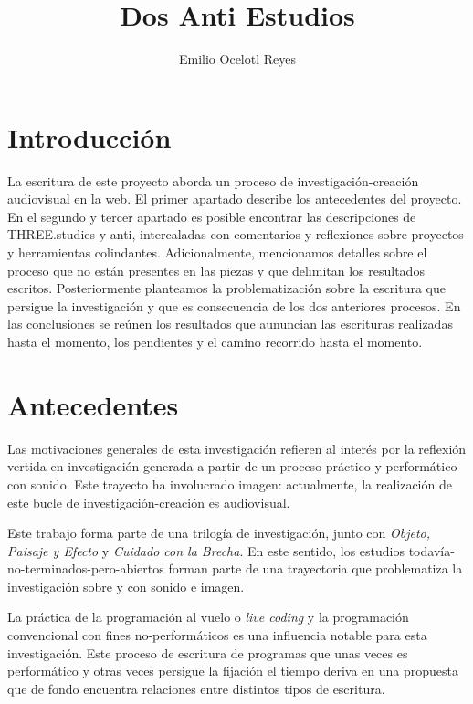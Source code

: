 \documentclass[11pt,letterpaper, twocolumn, twoside, openright,
headinclude,footinclude,BCOR5mm,
numbers=noenddot,cleardoublepage=empty,
tablecaptionabove]{article}
\author{Emilio Ocelotl Reyes}
\title{Dos Anti Estudios}
\begin{document}
\maketitle

\section*{Introducción}

La escritura de este proyecto aborda un proceso de investigación-creación audiovisual en la web. El primer apartado describe los antecedentes del proyecto. En el segundo y tercer apartado es posible encontrar las descripciones de THREE.studies y anti, intercaladas con comentarios y reflexiones sobre proyectos y herramientas colindantes. Adicionalmente, mencionamos detalles sobre el proceso que no están presentes en las piezas y que delimitan los resultados escritos. Posteriormente planteamos la problematización sobre la escritura que persigue la investigación y que es consecuencia de los dos anteriores procesos. En las conclusiones se reúnen los resultados que aununcian las escrituras realizadas hasta el momento, los pendientes y el camino recorrido hasta el momento. 

\section*{Antecedentes}

Las motivaciones generales de esta investigación refieren al interés por la reflexión vertida en investigación generada a partir de un proceso práctico y performático con sonido. Este trayecto ha involucrado imagen: actualmente, la realización de este bucle de investigación-creación es audiovisual. 

Este trabajo forma parte de una trilogía de investigación, junto con \emph{Objeto, Paisaje y Efecto} y \emph{Cuidado con la Brecha}. En este sentido, los estudios todavía-no-terminados-pero-abiertos forman parte de una trayectoria que problematiza la investigación sobre y con sonido e imagen. 

La práctica de la programación al vuelo o \emph{live coding} y la programación convencional con fines no-performáticos es una influencia notable para esta investigación. Este proceso de escritura de programas que unas veces es performático y otras veces persigue la fijación el tiempo deriva en una propuesta que de fondo encuentra relaciones entre distintos tipos de escritura. 

\end{document}
